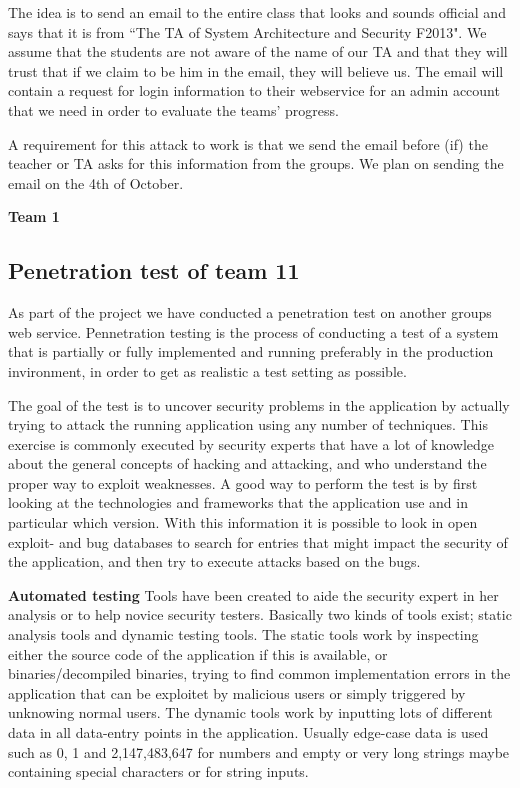 \documentclass[a4paper]{article}
\begin{document}
The idea is to send an email to the entire class that looks and sounds official and says that it is from ``The TA of System Architecture and Security F2013". We assume that the students are not aware of the name of our TA and that they will trust that if we claim to be him in the email, they will believe us. The email will contain a request for login information to their webservice for an admin account that we need in order to evaluate the teams' progress.

A requirement for this attack to work is that we send the email before (if) the teacher or TA asks for this information from the groups. We plan on sending the email on the 4th of October.


\textbf{Team 1}

\subsection{Penetration test of team 11}
As part of the project we have conducted a penetration test on another groups web service.
Pennetration testing is the process of conducting a test of a system that is partially or fully implemented and running preferably in the production invironment, in order to get as realistic a test setting as possible.

The goal of the test is to uncover security problems in the application by actually trying to attack the running application using any number of techniques. This exercise is commonly executed by security experts that have a lot of knowledge about the general concepts of hacking and attacking, and who understand the proper way to exploit weaknesses. 
A good way to perform the test is by first looking at the technologies and frameworks that the application use and in particular which version. With this information it is possible to look in open exploit- and bug databases to search for entries that might impact the security of the application, and then try to execute attacks based on the bugs.

\textbf{Automated testing}
Tools have been created to aide the security expert in her analysis or to help novice security testers. Basically two kinds of tools exist; static analysis tools and dynamic testing tools.
The static tools work by inspecting either the source code of the application if this is available, or binaries/decompiled binaries, trying to find common implementation errors in the application that can be exploitet by malicious users or simply triggered by unknowing normal users.
The dynamic tools work by inputting lots of different data in all data-entry points in the application. Usually edge-case data is used such as 0, 1 and 2,147,483,647 for numbers and empty or very long strings maybe containing special characters or for string inputs.
\end{document}
